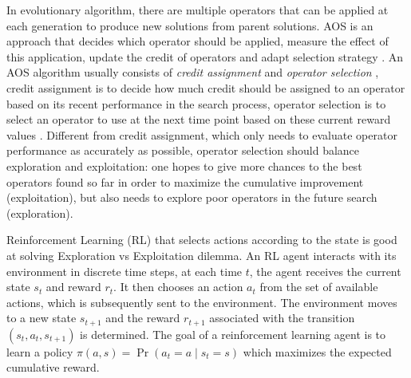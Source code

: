 \documentclass[journal]{IEEEtran}
\begin{document}
In evolutionary algorithm, there are multiple operators that can be applied at each generation to produce new solutions from parent solutions.
AOS is an approach that decides which operator should be applied, measure the effect of this application, update the credit of operators and adapt selection strategy \cite{li2011multi}.
An AOS algorithm usually consists of \textit{credit assignment} and \textit{operator selection} \cite{li2013evolving}, credit assignment is to decide how much credit should be assigned to an operator based on its recent performance in the search process, operator selection is to select an operator to use at the next time point based on these current reward values \cite{frrmab}.
Different from credit assignment, which only needs to evaluate operator performance as accurately as possible, operator selection should balance exploration and exploitation: one hopes to give more chances to the best operators found so far in order to maximize the cumulative improvement (exploitation), but also needs to explore poor operators in the future search (exploration).

Reinforcement Learning (RL) that selects actions according to the state is good at solving Exploration vs Exploitation dilemma.
An RL agent interacts with its environment in discrete time steps, at each time $t$, the agent receives the current state $s_t$ and reward $r_t$. It then chooses an action $a_t$ from the set of available actions, which is subsequently sent to the environment. The environment moves to a new state $s_{t+1}$ and the reward $r_{t+1}$ associated with the transition $(s_t, a_t, s_{t+1})$ is determined. The goal of a reinforcement learning agent is to learn a policy $\pi(a, s)=\operatorname{Pr}\left(a_{t}=a \mid s_{t}=s\right)$ which maximizes the expected cumulative reward.
\end{document}
